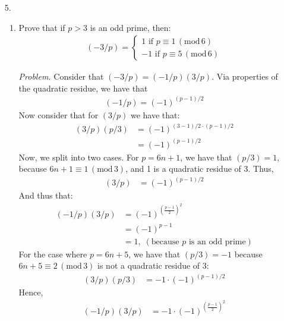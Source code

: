 \documentclass[10pt,oneside]{book}
\newcommand{\gspc}{\vspace{0.13cm}} %
\newcommand{\gmod}[1]{\,(\text{mod}\,#1)}
\let\endoldproof\endproof
\newenvironment{problem}[1]
  {\vspace{-0.1cm}\begin{coloredadjust}\begin{adjustwidth}{2em}{2em}
   \textit{Problem. }#1}
  {\endoldproof
\end{adjustwidth}\end{coloredadjust}\gspc}
\begin{document}
\begin{enumerate}
\begin{problem}
\begin{align*}
      &\equiv (0/3)
    \end{align*}
    0 is trivially a quadratic residue of 3. We have that:
    \begin{align*}
      (3/2^{2n}+1)&= -1
    \end{align*}
    Thus, 3 is a nonresidue of $(3/2^{2n}+1)$.
  \end{problem}
  \item [5.] \begin{enumerate}
    \item Prove that if $p>3$ is an odd prime, then:
    \begin{align*}
      (-3/p)=\begin{cases}
        1\text{ if }p\equiv 1\gmod 6\\
        -1 \text{ if }p\equiv 5 \gmod 6
      \end{cases}
    \end{align*}
    \pagebreak
    \begin{problem}
      Consider that $(-3/p)=(-1/p)(3/p)$. Via properties of the quadratic residue, we have that
      \begin{align*}
        (-1/p) = (-1)^{(p-1)/2}
      \end{align*}
      Now consider that for $(3/p)$ we have that:
      \begin{align*}
        (3/p)(p/3)&= (-1)^{(3-1)/2\cdot(p-1)/2}\\
          &=(-1)^{(p-1)/2}
      \end{align*}
      Now, we split into two cases. For $p =6n+1$, we have that $(p/3)=1$, because $6n+1\equiv 1 \gmod 3$, and 1 is a quadratic residue of 3. Thus,
      \begin{align*}
        (3/p)&=(-1)^{(p-1)/2}
      \end{align*}
      And thus that:
      \begin{align*}
        (-1/p)(3/p)&= (-1)^{(\frac{p-1}2)^2}\\
        &=(-1)^{p-1}\\
        &=1, \;(\text{because }p\text{ is an odd prime})
      \end{align*}
      For the case where $p=6n+5$, we have that $(p/3)=-1$ because $6n+5\equiv 2 \gmod 3$ is not a quadratic residue of 3:
      \begin{align*}
        (3/p)(p/3)&= -1\cdot(-1)^{(p-1)/2}
      \end{align*}
      Hence, 
      \begin{align*}
        (-1/p)(3/p)&= -1\cdot(-1)^{(\frac{p-1}2)^2}\\

\end{align*}
\end{problem}
\end{enumerate}
\end{enumerate}
\end{document}
